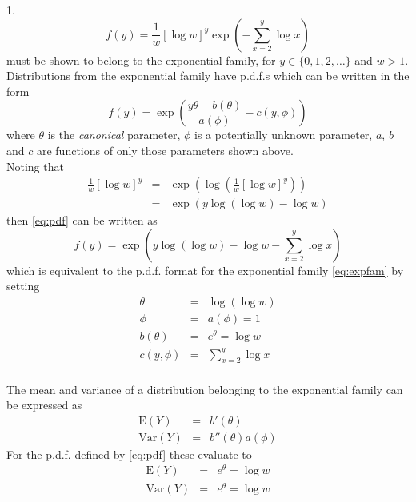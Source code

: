 \documentclass[a4paper,11pt]{article}
\begin{document}

1.
\begin{equation}\label{eq:pdf}
f(y) = \frac{1}{w}[\log w]^y \exp\left(-\sum_{x=2}^y \log x\right)
\end{equation}
must be shown to belong to the exponential family, for $y \in \{0,1,2,\dots\}$ and $w > 1$. Distributions from the exponential family have p.d.f.s which can be written in the form
\begin{equation}\label{eq:expfam}
f(y)=\exp\left(\frac{y\theta-b(\theta)}{a(\phi)}-c(y,\phi)\right)
\end{equation}
where $\theta$ is the {\em canonical} parameter, $\phi$ is a potentially unknown parameter, $a$, $b$ and $c$ are functions of only those parameters shown above.\\

Noting that
\begin{eqnarray*}
\frac{1}{w}[\log w]^y & = & \exp\left(\log(\frac{1}{w}[\log w]^y)\right)\\
											& = & \exp\left(y\log(\log w) - \log w\right)
\end{eqnarray*}
then \eqref{eq:pdf} can be written as
\begin{equation*}
f(y) =  \exp\left(y\log(\log w) - \log w - \sum_{x=2}^{y}\log x\right)
\end{equation*}
which is equivalent to the p.d.f. format for the exponential family \eqref{eq:expfam} by setting
\begin{eqnarray*}
\theta & = & \log(\log w)\\
\phi 	 & = & a(\phi) = 1\\
b(\theta) & = & e^\theta = \log w\\
c(y,\phi) & = & \sum_{x=2}^{y} \log x\\
\end{eqnarray*}

The mean and variance of a distribution belonging to the exponential family can be expressed as
\begin{eqnarray*}
\text{E}(Y) & = & b'(\theta)\\
\text{Var}(Y) & = & b''(\theta)a(\phi)
\end{eqnarray*}
For the p.d.f. defined by \eqref{eq:pdf} these evaluate to
\begin{eqnarray*}
\text{E}(Y) & = & e^\theta = \log w\\
\text{Var}(Y) & = & e^\theta = \log w
\end{eqnarray*}
\end{document}
